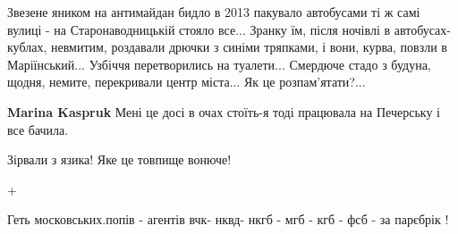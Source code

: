 \begin{itemize}
 

Звезене яником на антимайдан бидло в 2013 пакувало автобусами ті ж самі вулиці
- на Старонаводницькій стояло все... Зранку їм, після ночівлі в
автобусах-кублах, невмитим, роздавали дрючки з синіми тряпками, і вони, курва,
повзли в Маріїнський... Узбіччя перетворились на туалети... Смердюче стадо з
будуна, щодня, немите, перекривали центр міста... Як це розпам'ятати?...

\begin{itemize}
 
\textbf{Marina Kaspruk} Мені це досі в очах стоїть-я тоді працювала на Печерську і все бачила.

 
Зірвали з язика! Яке це товпище вонюче!
\end{itemize}

 
+

 
Геть московських.попів - агентів вчк- нквд- нкгб - мгб - кгб - фсб - за парєбрік !

 

\end{itemize}
